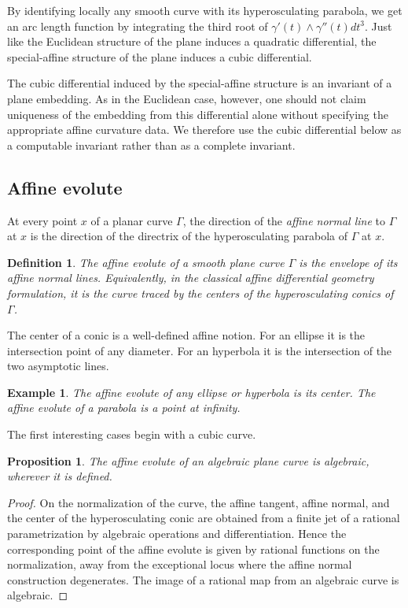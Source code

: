 \documentclass[reqno]{amsart}
\newtheorem{proposition}[theorem]{Proposition}
\newtheorem{definition}{Definition}
\newtheorem{example}{Example}
\theoremstyle{definition}
\theoremstyle{remark}
\theoremstyle{definition}
\theoremstyle{definition}
\theoremstyle{definition}
\begin{document}
By identifying locally any smooth curve with its hyperosculating parabola, we get an arc length function by integrating the third root of $\gamma'(t) \wedge \gamma''(t)dt^{3}$. Just like the Euclidean structure of the plane induces a quadratic differential, the special-affine structure of the plane induces a cubic differential.

The cubic differential induced by the special-affine structure is an invariant of a plane embedding. As in the Euclidean case, however, one should not claim uniqueness of the embedding from this differential alone without specifying the appropriate affine curvature data. We therefore use the cubic differential below as a computable invariant rather than as a complete invariant.

\subsection{Affine evolute}

At every point $x$ of a planar curve $\Gamma$, the direction of the \textit{affine normal line} to $\Gamma$ at $x$ is the direction of the directrix of the hyperosculating parabola of $\Gamma$ at $x$.

\begin{definition}
The \textit{affine evolute} of a smooth plane curve $\Gamma$ is the envelope of its affine normal lines. Equivalently, in the classical affine differential geometry formulation, it is the curve traced by the centers of the hyperosculating conics of $\Gamma$.
\end{definition}

The center of a conic is a well-defined affine notion. For an ellipse it is the intersection point of any diameter. For an hyperbola it is the intersection of the two asymptotic lines.

\begin{example}
The affine evolute of any ellipse or hyperbola is its center. The affine evolute of a parabola is a point at infinity.
\end{example}

The first interesting cases begin with a cubic curve.

\begin{proposition}
The affine evolute of an algebraic plane curve is algebraic, wherever it is defined.
\end{proposition}

\begin{proof}
On the normalization of the curve, the affine tangent, affine normal, and the center of the hyperosculating conic are obtained from a finite jet of a rational parametrization by algebraic operations and differentiation. Hence the corresponding point of the affine evolute is given by rational functions on the normalization, away from the exceptional locus where the affine normal construction degenerates. The image of a rational map from an algebraic curve is algebraic.
\end{proof}
\end{document}
